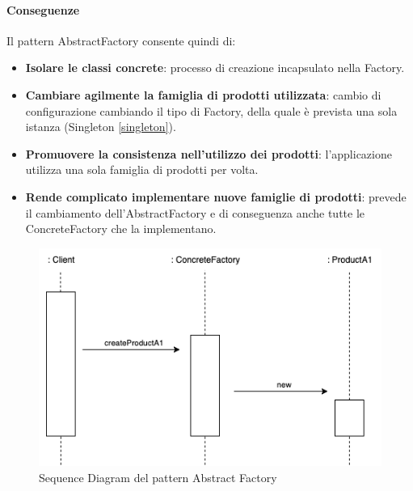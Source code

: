 \paragraph{Conseguenze} Il pattern AbstractFactory consente quindi di:
\begin{itemize}
    \item \textbf{Isolare le classi concrete}: processo di creazione incapsulato nella Factory.
    \item \textbf{Cambiare agilmente la famiglia di prodotti utilizzata}: cambio di configurazione cambiando il tipo di Factory, della quale è prevista una sola istanza (Singleton \ref{singleton}).
    \item \textbf{Promuovere la consistenza nell'utilizzo dei prodotti}: l'applicazione utilizza una sola famiglia di prodotti per volta.
    \item \textbf{Rende complicato implementare nuove famiglie di prodotti}: prevede il cambiamento dell'AbstractFactory e di conseguenza anche tutte le ConcreteFactory che la implementano.
\end{itemize}

\begin{figure}[H]
    \centering
    \includegraphics[width=0.75\linewidth]{assets/pattern/abstract-factory/abstract-factory-sequence.drawio.png}
    \caption{Sequence Diagram del pattern Abstract Factory}
\end{figure}

\newpage